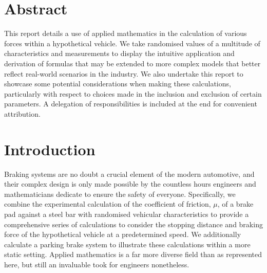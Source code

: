 \documentclass[../main.tex]{subfiles}
\begin{document}
\section{Abstract}
This report details a use of applied mathematics in the calculation of various forces within a hypothetical vehicle.
We take randomised values of a multitude of characteristics and measurements to display the intuitive application and derivation of formulas that may be extended to more complex models that better reflect real-world scenarios in the industry.
We also undertake this report to showcase some potential considerations when making these calculations, particularly with respect to choices made in the inclusion and exclusion of certain parameters.
A delegation of responsibilities is included at the end for convenient attribution.
\newpage

\tableofcontents
\newpage

\section{Introduction}
Braking systems are no doubt a crucial element of the modern automotive, and their complex design is only made possible by the countless hours engineers and mathematicians dedicate to ensure the safety of everyone.
Specifically, we combine the experimental calculation of the coefficient of friction, $\mu$, of a brake pad against a steel bar with randomised vehicular characteristics to provide a comprehensive series of calculations to consider the stopping distance and braking force of the hypothetical vehicle at a predetermined speed.
We additionally calculate a parking brake system to illustrate these calculations within a more static setting.
Applied mathematics is a far more diverse field than as represented here, but still an invaluable took for engineers nonetheless.
\end{document}
